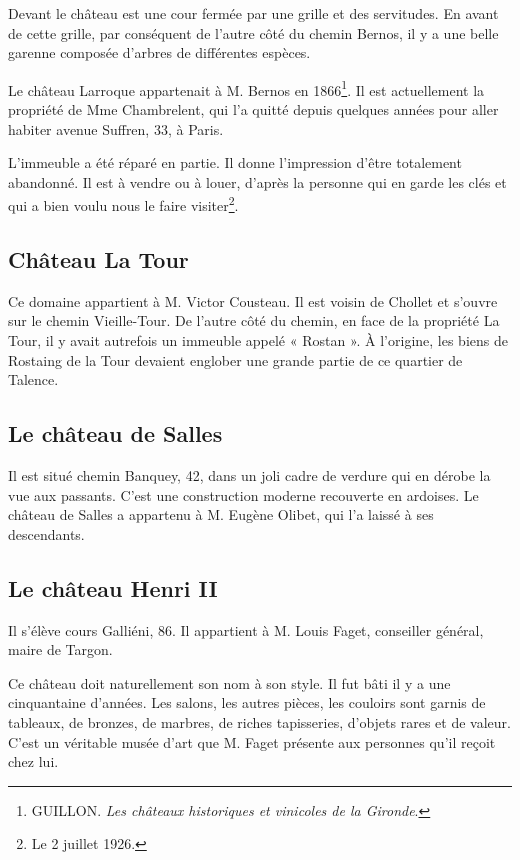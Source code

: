Devant le château est une cour fermée par une grille et des servitudes. En avant de cette grille, par conséquent de l'autre côté du chemin Bernos, il y a une belle garenne composée d'arbres de différentes espèces.

Le château Larroque appartenait à M. Bernos en 1866\footnote{GUILLON. \textit{Les châteaux historiques et vinicoles de la Gironde}.}. Il est actuellement la propriété de Mme Chambrelent, qui l'a quitté depuis quelques années pour aller habiter avenue Suffren, 33, à Paris.

L'immeuble a été réparé en partie. Il donne l'impression d'être totalement abandonné. Il est à vendre ou à louer, d'après la personne qui en garde les clés et qui a bien voulu nous le faire visiter\footnote{Le 2 juillet 1926.}.

\subsection{Château La Tour}

Ce domaine appartient à M. Victor Cousteau. Il est voisin de Chollet et s'ouvre sur le chemin Vieille-Tour. De l'autre côté du chemin, en face de la propriété La Tour, il y avait autrefois un immeuble appelé « Rostan ». À l'origine, les biens de Rostaing de la Tour devaient englober une grande partie de ce quartier de Talence. 

\subsection{Le château de Salles}

Il est situé chemin Banquey, 42, dans un joli cadre de verdure qui en dérobe la vue aux passants. C'est une construction moderne recouverte en ardoises. Le château de Salles a appartenu à M. Eugène Olibet, qui l'a laissé à ses descendants.

\subsection{Le château Henri II}

Il s'élève cours Galliéni, 86. Il appartient à M. Louis Faget, conseiller général, maire de Targon.

Ce château doit naturellement son nom à son style. Il fut bâti il y a une cinquantaine d'années. Les salons, les autres pièces, les couloirs sont garnis de tableaux, de bronzes, de marbres, de riches tapisseries, d'objets rares et de valeur. C'est un véritable musée d'art que M. Faget présente aux personnes qu'il reçoit chez lui.

